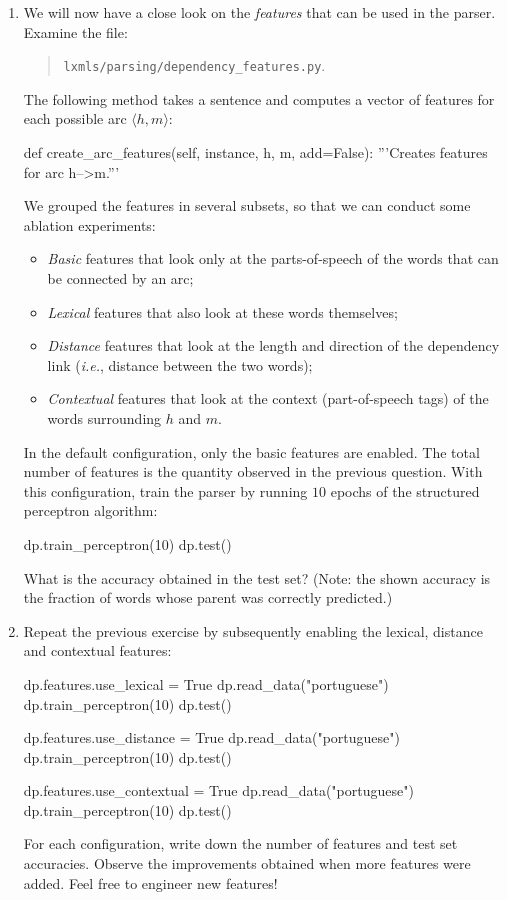 \begin{exercise}
\begin{enumerate}
\item We will now have a close look on the \emph{features} that can be used in the parser. 
Examine the file:
\begin{quote}
{\tt lxmls/parsing/dependency\_features.py}. 
\end{quote}
The following method takes a sentence and computes a vector of features for each possible arc $\langle h, m \rangle$: 
\begin{python}
def create_arc_features(self, instance, h, m, add=False):
	'''Creates features for arc h-->m.'''
\end{python}
We grouped the features in several subsets, so that we can conduct some ablation experiments: 
\begin{itemize}
\item \emph{Basic} features that look only at the parts-of-speech of the words that can be connected by an arc;
\item \emph{Lexical} features that also look at these words themselves;
\item \emph{Distance} features that look at the length and direction of the dependency link (\emph{i.e.}, distance between the two words);
\item \emph{Contextual} features that look at the context (part-of-speech tags) of the words 
surrounding $h$ and $m$. 
\end{itemize}
In the default configuration, only the basic features are enabled. The total number of features 
is the quantity observed in the previous question. 
With this configuration, 
train the parser by running $10$ epochs of the structured perceptron algorithm: 
\begin{python}
dp.train_perceptron(10)
dp.test()
\end{python}
What is the accuracy obtained in the test set? (Note: the shown accuracy is the fraction of words whose parent was correctly predicted.) 

\item Repeat the previous exercise by 
subsequently enabling the lexical, distance and contextual features:
\begin{python}
dp.features.use_lexical = True
dp.read_data("portuguese")
dp.train_perceptron(10)
dp.test()

dp.features.use_distance = True
dp.read_data("portuguese")
dp.train_perceptron(10)
dp.test()

dp.features.use_contextual = True
dp.read_data("portuguese")
dp.train_perceptron(10)
dp.test()
\end{python}
For each configuration, write down the number of features and test set accuracies. 
Observe the improvements obtained when more features were added. 
Feel free to engineer new features!


\end{enumerate}
\end{exercise}
